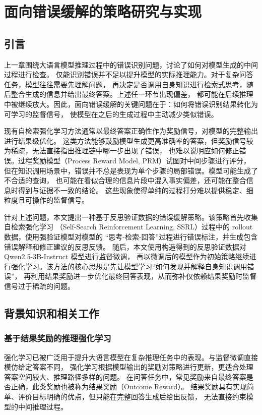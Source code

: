 
\chapter{面向错误缓解的策略研究与实现}

\section{引言}

上一章围绕大语言模型推理过程中的错误识别问题，讨论了如何对模型生成的中间过程进行检查。
仅能识别错误并不足以提升模型的实际推理能力。对于复杂问答任务，模型往往需要先理解问题，
再决定是否调用自身知识进行检索式思考，随后整合生成的信息并给出最终答案。上述任一环节出现偏差，
都可能在后续推理中被继续放大。因此，面向错误缓解的关键问题在于：如何将错误识别结果转化为可学习的监督信号，
使模型在之后的生成过程中主动减少类似错误。

现有自检索强化学习方法通常以最终答案正确性作为奖励信号，对模型的完整输出进行结果级优化。
这类方法能够鼓励模型生成更高准确率的答案，但奖励信号较为稀疏，无法直接指出推理链中哪一步出现了错误，
也难以说明应如何修正错误。过程奖励模型（Process Reward Model, PRM）试图对中间步骤进行评分，
但在知识调用场景中，错误并不总是表现为单个步骤的局部错误。模型可能生成了不合适的查询，
也可能在看似合理的信息片段中混入事实偏差，还可能在整合信息时得到与证据不一致的结论。
这些现象使得单纯的过程打分难以提供稳定、细粒度且可操作的监督信号。

针对上述问题，本文提出一种基于反思验证数据的错误缓解策略。该策略首先收集自检索强化学习
（Self-Search Reinforcement Learning, SSRL）过程中的 rollout 数据，使用强验证模型对模型的
“思考-检索-回答”过程进行错误标注，并生成包含错误解释和修正建议的反思反馈。
随后，本文使用构造得到的反思验证数据对 Qwen2.5-3B-Instruct 模型进行监督微调，
再以微调后的模型作为初始策略继续进行强化学习。该方法的核心思想是先让模型学习“如何发现并解释自身知识调用错误”，
再利用结果奖励进一步优化最终回答表现，从而弥补仅依赖结果奖励时监督信号过于稀疏的问题。

\section{背景知识和相关工作}

\subsection{基于结果奖励的推理强化学习}

强化学习已被广泛用于提升大语言模型在复杂推理任务中的表现。与监督微调直接模仿给定答案不同，
强化学习根据模型输出的奖励对策略进行更新，更适合处理答案空间较大、推理路径多样的问题。
在问答任务中，常见奖励来自最终答案是否正确，此类奖励也被称为结果奖励（Outcome Reward）。
结果奖励具有实现简单、评价目标明确的优点，但只能在完整回答生成后给出反馈，
无法直接约束模型的中间推理过程。

